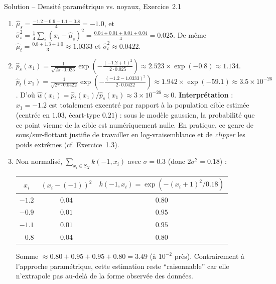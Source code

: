 \documentclass[11pt]{article}
\begin{document}
\begin{exercisebox}{Solution -- Densité paramétrique vs. noyaux, Exercice~2.1}
\begin{enumerate}[label=(\alph*)]
\item $\hat\mu_s = \frac{-1.2-0.9-1.1-0.8}{4} = -1.0$, et $\hat\sigma_s^2 =
\frac{1}{4}\sum_i(x_i-\hat\mu_s)^2 = \frac{0.04+0.01+0.01+0.04}{4} = 0.025$.
De même $\hat\mu_t = \frac{0.8+1.3+1.0}{3} \approx 1.0333$ et $\hat\sigma_t^2 \approx 0.0422$.
\item $\hat p_s(x_1) = \frac{1}{\sqrt{2\pi\cdot 0.025}}\exp\!\left(-\frac{(-1.2+1)^2}{2\cdot
0.025}\right) \approx 2.523 \times \exp(-0.8) \approx 1.134$. $\hat p_t(x_1) = \frac{1}{\sqrt{2\pi\cdot
0.0422}}\exp\!\left(-\frac{(-1.2-1.0333)^2}{2\cdot 0.0422}\right) \approx 1.942\times\exp(-59.1) \approx
3.5\times 10^{-26}$. D'où $\hat w(x_1) = \hat p_t(x_1)/\hat p_s(x_1) \approx 3\times 10^{-26} \approx 0$.
\textbf{Interprétation} : $x_1=-1.2$ est totalement excentré par rapport à la population cible estimée
(centrée en $1.03$, écart-type $0.21$) : sous le modèle gaussien, la probabilité que ce point vienne de
la cible est numériquement nulle. En pratique, ce genre de sous/sur-flottant justifie de travailler en
log-vraisemblance et de \emph{clipper} les poids extrêmes (cf. Exercice~1.3).
\item Non normalisé, $\sum_{x_i\in S_X} k(-1,x_i)$ avec $\sigma=0.3$ (donc $2\sigma^2=0.18$) :
\begin{center}
\begin{tabular}{ccc}
\toprule
$x_i$ & $(x_i-(-1))^2$ & $k(-1,x_i)=\exp(-(x_i+1)^2/0.18)$ \\
\midrule
$-1.2$ & $0.04$ & $0.80$ \\
$-0.9$ & $0.01$ & $0.95$ \\
$-1.1$ & $0.01$ & $0.95$ \\
$-0.8$ & $0.04$ & $0.80$ \\
\bottomrule
\end{tabular}
\end{center}
Somme $\approx 0.80+0.95+0.95+0.80 = 3.49$ (à $10^{-2}$ près). Contrairement à l'approche paramétrique,
cette estimation reste \enquote{raisonnable} car elle n'extrapole pas au-delà de la forme observée des
données.
\end{enumerate}
\end{exercisebox}
\end{document}
